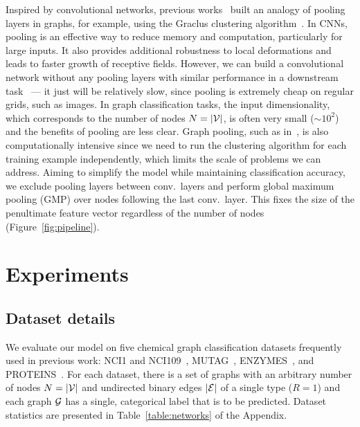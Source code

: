 \documentclass[final,nonatbib]{article} \usepackage{nips_2018}
\begin{document}
	Inspired by convolutional networks, previous works~\cite{bruna2013spectral, defferrard2016convolutional,monti2017geometric,simonovsky2017dynamic,fey2018splinecnn} built an analogy of pooling layers in graphs, for example, using the Graclus clustering algorithm~\cite{dhillon2007weighted}.
	In CNNs, pooling is an effective way to reduce memory and computation, particularly for large inputs. It also provides additional robustness to local deformations and leads to faster growth of receptive fields. However, we can build a convolutional network without any pooling layers with similar performance in a downstream task~\cite{springenberg2014striving} --- it just will be relatively slow, since pooling is extremely cheap on regular grids, such as images.
	In graph classification tasks, the input dimensionality, which corresponds to the number of nodes $N=|\cal V|$, is often very small ($\sim10^2$) and the benefits of pooling are less clear. Graph pooling, such as in~\cite{dhillon2007weighted}, is also computationally intensive since we need to run the clustering algorithm for each training example independently, which limits the scale of problems we can address.
	Aiming to simplify the model while maintaining classification accuracy, we exclude pooling layers between conv.~layers and perform global maximum pooling (GMP) over nodes following the last conv.~layer. This fixes the size of the penultimate feature vector regardless of the number of nodes (Figure~\ref{fig:pipeline}).


	\section{Experiments}\label{sec:experiments}



	\subsection{Dataset details}
	We evaluate our model on five chemical graph classification datasets frequently used in previous work: NCI1 and NCI109~\cite{wale2008comparison}, MUTAG~\cite{debnath1991structure}, ENZYMES~\cite{schomburg2004brenda}, and PROTEINS~\cite{borgwardt2005protein}. For each dataset, there is a set of graphs with an arbitrary number of nodes $N=|\cal V|$ and undirected binary edges $|\cal E|$ of a single type ($R=1$) and each graph $\cal G$ has a single, categorical label that is to be predicted. Dataset statistics are presented in Table~\ref{table:networks} of the Appendix.
\end{document}
